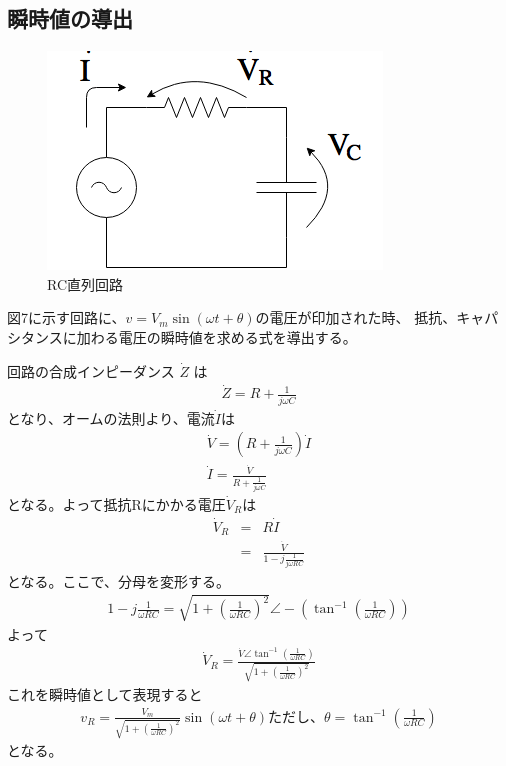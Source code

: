 \documentclass[dvipdfmx]{jsarticle}
\begin{document}
\subsection{瞬時値の導出}
\begin{figure}[h]
  \centering
  \includegraphics[scale=0.4]{RC_Series_Circuit.png}
  \caption{RC直列回路}
  \label{fig:RC_Series_Circuit2}
\end{figure}
図7に示す回路に、$v = V_m\sin(\omega t + \theta)$の電圧が印加された時、
抵抗、キャパシタンスに加わる電圧の瞬時値を求める式を導出する。

回路の合成インピーダンス $\dot Z$ は
\begin{eqnarray*}
    \dot Z = R + \frac{1}{j\omega C}
\end{eqnarray*}
となり、オームの法則より、電流$\dot I$は
\begin{eqnarray*}
    \dot V = (R + \frac{1}{j\omega C})\dot I\\
    \dot I = \frac{\dot V}{R + \frac{1}{j\omega C}}
\end{eqnarray*}
となる。よって抵抗Rにかかる電圧$\dot V_R$は
\begin{eqnarray*}
  \dot V_R & = & R \dot I\\
  & = & \frac{\dot V}{1 - j\frac{1}{j\omega RC}}
\end{eqnarray*}
となる。ここで、分母を変形する。
\begin{eqnarray*}
  1- j\frac{1}{\omega RC} = \sqrt{1 + (\frac{1}{\omega RC})^2}\angle -(\tan^{-1}(\frac{1}{\omega RC}))
\end{eqnarray*}
よって
\begin{eqnarray*}
  \dot V_R = \frac{\dot V \angle \tan^{-1}(\frac{1}{\omega RC})}{\sqrt{1 + (\frac{1}{\omega RC})^2}}
\end{eqnarray*}
これを瞬時値として表現すると
\begin{eqnarray*}
  v_R = \frac{V_m}{\sqrt{1 + (\frac{1}{\omega RC})^2}} \sin(\omega t + \theta) ただし、\theta = \tan^{-1}(\frac{1}{\omega RC})
\end{eqnarray*}
となる。
\end{document}
